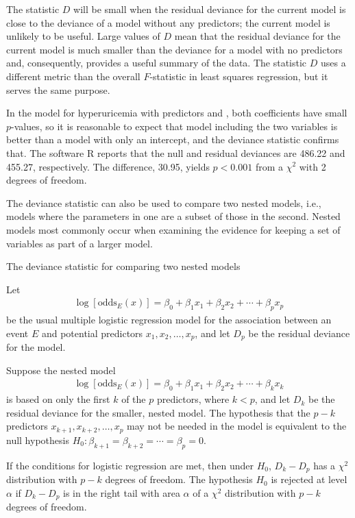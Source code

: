 The statistic $D$ will be small when the residual deviance for the current model is close to the deviance of a model without any predictors; the current model is unlikely to be useful.  Large values of $D$ mean that the residual deviance for the current model is much smaller than the deviance for a model with no predictors and, consequently, provides a useful summary of the data.  The statistic $D$ uses a different metric than the overall $F$-statistic in least squares regression, but it serves the same purpose.

In the model for hyperuricemia with predictors  and , both coefficients have small $p$-values, so it is reasonable to expect that model including the two variables is better than a model with only an intercept, and the deviance statistic confirms that.  The software \textsf{R} reports that the null and residual deviances are 486.22 and 455.27, respectively.  The difference, 30.95, yields $p < 0.001$ from a $\chi^2$ with 2 degrees of freedom.  

The deviance statistic can also be used to compare two nested models, i.e., models where the parameters in one are a subset of those in the second.  Nested models most commonly occur when examining the evidence for keeping a set of variables as part of a larger model.

\begin{onebox}{The deviance statistic for comparing two nested models}

Let
  \begin{align}
     \log\left[\text{odds}_E(x)\right] = \beta_0 + \beta_1 x_1 +
      \beta_2 x_2 + \cdots + \beta_p x_p
      \label{eqn:nestedModelPPredictors}
  \end{align}
  be the usual multiple logistic regression model for the association between an event $E$ and potential predictors $x_1, x_2, \ldots, x_p$, and let $D_p$ be the residual deviance for the model.

  Suppose the nested model
  \begin{align}
     \log\left[\text{odds}_E(x)\right] = \beta_0 + \beta_1 x_1 +
      \beta_2 x_2 + \cdots + \beta_k x_k
      \label{eqn:nestedModelKPredictors}
  \end{align}
  is based on only the first $k$ of the $p$ predictors, where $k<p$, and let $D_k$ be the residual deviance for the smaller, nested model.   The hypothesis that the $p - k$ predictors $x_{k+1}, x_{k+2}, \ldots, x_{p}$ may not be needed in the model is equivalent to the null hypothesis $H_0: \beta_{k+1} = \beta_{k+2} = \cdots  = \beta_p = 0$.
  \vspace{0.1in}

If the conditions for logistic regression are met, then under $H_0$, $D_k - D_p$ has a $\chi^2$ distribution with $p - k$ degrees of freedom.  The hypothesis $H_0$  is rejected at level $\alpha$ if $D_k - D_p$ is in the right tail with area $\alpha$ of a $\chi^2$ distribution with $p - k$ degrees of freedom.
\end{onebox}

